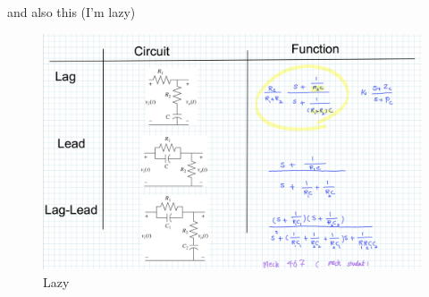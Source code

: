 \documentclass{article}
\begin{document}
and also this (I'm lazy)

\begin{figure}[H]
  \centering
  \begin{center}
    \includegraphics[width=\textwidth]{images/lazy.png}
  \end{center}

  \caption{Lazy}
  \label{fig:lazy}
\end{figure}
\end{document}
